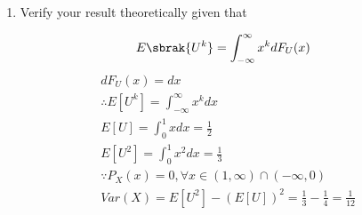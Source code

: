 \documentclass[journal,12pt,twocolumn]{IEEEtran}
\begin{document}
\begin{enumerate}[label=\thesection.\arabic*
,ref=\thesection.\theenumi]
Write a C program to  find the mean and variance of $U$. \\
\solution
\begin{lstlisting}
wget https://github.com/rudranshm/Random/blob/main/Code/meanvar1.4.c
\end{lstlisting}
Use below command to run file,
\begin{lstlisting}
cc mean_var.c -lm
./a.out
\end{lstlisting}
running the code gives us the mean as 0.500031 an the variance as 0.083247
\item Verify your result theoretically given that
\end{enumerate}
%
\begin{equation}
E\sbrak{U^k} = \int_{-\infty}^{\infty}x^kdF_{U}(x)
\end{equation}
\begin{align}
&dF_{U}(x)=dx\\
&\therefore E[U^k]=\int_{-\infty}^{\infty} x^k dx\\
&E[U]=\int_{0}^{1} x dx=\frac{1}{2}\\
&E[U^2]=\int_{0}^{1} x^2 dx=\frac{1}{3}\\
&\because P_{X}(x)=0 ,\forall x \in (1,\infty)\cap (-\infty,0)\\
&Var(X)=E[U^2]-(E[U])^2=\frac{1}{3}-\frac{1}{4}=\frac{1}{12}
\end{align}
\end{document}
